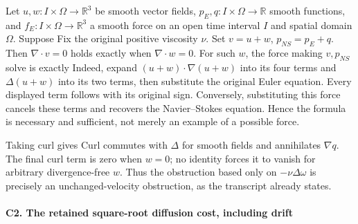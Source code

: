 Let \(u,w:I\times\Omega\to\mathbb R^3\) be smooth vector fields,
\(p_E,q:I\times\Omega\to\mathbb R\) smooth functions, and
\(f_E:I\times\Omega\to\mathbb R^3\) a smooth force on an open time
interval \(I\) and spatial domain \(\Omega\). Suppose  Fix the original positive viscosity \(\nu\). Set \(v=u+w\),
\(p_{NS}=p_E+q\). Then \(\nabla\cdot v=0\) holds exactly when
\(\nabla\cdot w=0\). For such \(w\), the force making \(v,p_{NS}\) solve
 is exactly  Indeed, expand \((u+w)\cdot\nabla(u+w)\) into its four terms and
\(\Delta(u+w)\) into its two terms, then substitute the original Euler
equation. Every displayed term follows with its original sign.
Conversely, substituting this force cancels these terms and recovers the
Navier--Stokes equation. Hence the formula is necessary and sufficient,
not merely an example of a possible force.

Taking curl gives  Curl commutes with \(\Delta\) for smooth fields and annihilates
\(\nabla q\). The final curl term is zero when \(w=0\); no identity
forces it to vanish for arbitrary divergence-free \(w\). Thus the
obstruction based only on \(-\nu\Delta\omega\) is precisely an
unchanged-velocity obstruction, as the transcript already states.

\paragraph{C2. The retained square-root diffusion cost, including
drift}\label{TranscriptLedgerStage:c2.-the-retained-square-root-diffusion-cost-including-drift}

